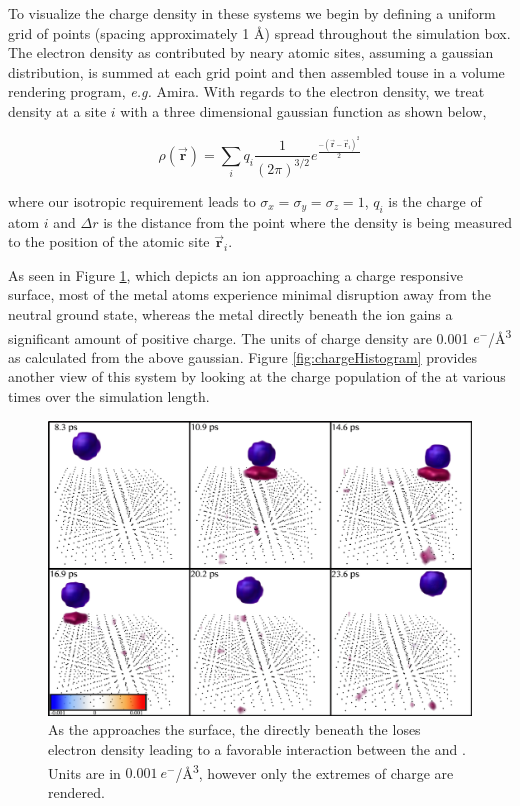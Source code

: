 To visualize the charge density in these systems we begin by defining a uniform
grid of points (spacing approximately 1 \AA) spread throughout the simulation
box. The electron density as contributed by neary atomic sites, assuming a
gaussian distribution, is summed at each grid point and then assembled touse in
a volume rendering program, {\em e.g.} Amira. With regards to the electron
density, we treat density at a site $i$ with a three dimensional gaussian
function as shown below,

\begin{equation*}
\rho(\vec{\mathbf{r}}) = \sum_i q_{i} \frac{1}{(2\pi)^{3/2}}e^{\frac{-(\vec{\mathbf{r}}-\vec{\mathbf{r}}_i)^2}{2}}
\end{equation*}

where our isotropic requirement leads to $\sigma_x = \sigma_y = \sigma_z = 1$,
$q_i$ is the charge of atom $i$ and $\Delta r$ is the distance from the point
where the density is being measured to the position of the atomic site
$\vec{\mathbf{r}}_i$. 

As seen in Figure \ref{fig:chargeVol}, which depicts an  ion approaching
a charge responsive  surface, most of the metal atoms experience minimal
disruption away from the neutral ground state, whereas the metal directly
beneath the  ion gains a significant amount of positive charge. The
units of charge density are 0.001 $e^-$/\AA\textsuperscript{3} as calculated from the
above gaussian. Figure \ref{fig:chargeHistogram} provides another view of this
system by looking at the charge population of the  at various times over
the simulation length.

\begin{landscape}
\begin{figure}
  \centering
  \includegraphics[width=0.7\linewidth]{../figures/chap5/PtOChargeVolume.pdf}
  \caption{As the  approaches the surface, the  directly beneath
the  loses electron density leading to a favorable interaction between
the  and . Units are in $0.001\ e^-$/\AA\textsuperscript{3},
however only the extremes of charge are rendered.}
\label{fig:chargeVol}
\end{figure}
\end{landscape}

